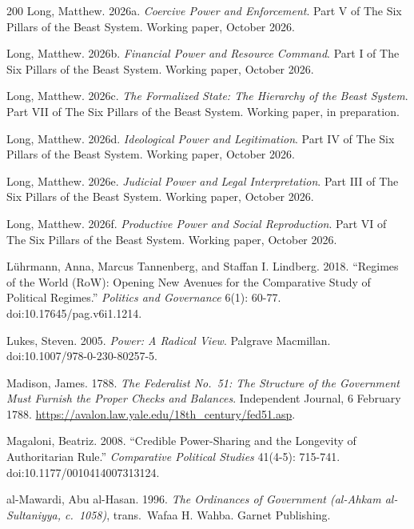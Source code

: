 \documentclass[11pt,letterpaper]{article}
\theoremstyle{definition}
\theoremstyle{remark}
\begin{document}
\begin{thebibliography}{200}
Long, Matthew. 2026a. \emph{Coercive Power and Enforcement}. Part V of The Six Pillars of the Beast System. Working paper, October 2026.

Long, Matthew. 2026b. \emph{Financial Power and Resource Command}. Part I of The Six Pillars of the Beast System. Working paper, October 2026.

Long, Matthew. 2026c. \emph{The Formalized State: The Hierarchy of the Beast System}. Part VII of The Six Pillars of the Beast System. Working paper, in preparation.

Long, Matthew. 2026d. \emph{Ideological Power and Legitimation}. Part IV of The Six Pillars of the Beast System. Working paper, October 2026.

Long, Matthew. 2026e. \emph{Judicial Power and Legal Interpretation}. Part III of The Six Pillars of the Beast System. Working paper, October 2026.

Long, Matthew. 2026f. \emph{Productive Power and Social Reproduction}. Part VI of The Six Pillars of the Beast System. Working paper, October 2026.

L\"uhrmann, Anna, Marcus Tannenberg, and Staffan I. Lindberg. 2018. ``Regimes of the World (RoW): Opening New Avenues for the Comparative Study of Political Regimes.'' \emph{Politics and Governance} 6(1): 60-77. doi:10.17645/pag.v6i1.1214.

Lukes, Steven. 2005. \emph{Power: A Radical View}. Palgrave Macmillan. doi:10.1007/978-0-230-80257-5.

Madison, James. 1788. \emph{The Federalist No.~51: The Structure of the Government Must Furnish the Proper Checks and Balances}. Independent Journal, 6 February 1788. \url{https://avalon.law.yale.edu/18th_century/fed51.asp}.

Magaloni, Beatriz. 2008. ``Credible Power-Sharing and the Longevity of Authoritarian Rule.'' \emph{Comparative Political Studies} 41(4-5): 715-741. doi:10.1177/0010414007313124.

al-Mawardi, Abu al-Hasan. 1996. \emph{The Ordinances of Government (al-Ahkam al-Sultaniyya, c.~1058)}, trans.~Wafaa H. Wahba. Garnet Publishing.


\end{thebibliography}
\end{document}
